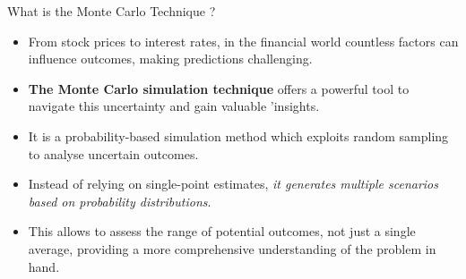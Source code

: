\documentclass{beamer}
\begin{document}
\begin{frame}{What is the Monte Carlo Technique ?}
\begin{itemize}
	\item From stock prices to interest rates, in the financial world countless factors can influence outcomes, making predictions challenging. 
	\item \textbf{The Monte Carlo simulation technique} offers a powerful tool to navigate this uncertainty and gain valuable 'insights.
	\item It is a probability-based simulation method which exploits random sampling to analyse uncertain outcomes.
	\item Instead of relying on single-point estimates, \emph{it generates multiple scenarios based on probability distributions}. 
	\item This allows to assess the range of potential outcomes, not just a single average, providing a more comprehensive understanding of the problem in hand.
\end{itemize}
\end{frame}
\end{document}
